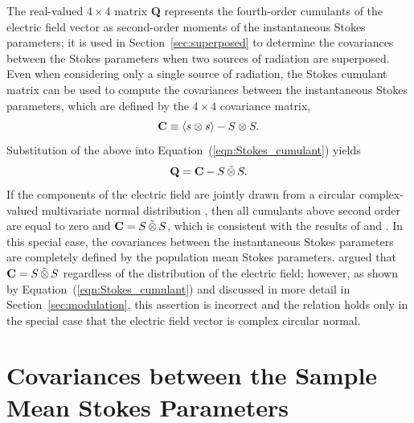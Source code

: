 \documentclass[twocolumn]{aastex6}
\newcommand{\Eqn}[1]{Equation~(\ref{eqn:#1})}
\newcommand{\Sec}[1]{Section~\ref{sec:#1}}
\newcommand{\outerBilinear}[2]{\ensuremath{{#1}\otimes{#2}}}
\newcommand{\stimes}{\ensuremath{\tilde{\otimes}}}
\newcommand{\spinorBilinear}[2]{\ensuremath{{#1}\,\stimes\,{#2}}}
\begin{document}
The real-valued $4\times4$ matrix {\bf Q} represents the fourth-order
cumulants of the electric field vector as second-order moments of the
instantaneous Stokes parameters; it is used in \Sec{superposed} to
determine the covariances between the Stokes parameters when two
sources of radiation are superposed.
%
Even when considering only a single source of radiation, the Stokes
cumulant matrix can be used to compute the covariances between the
instantaneous Stokes parameters, which are defined by the $4\times4$
covariance matrix,
%
\begin{equation}
  {\bf C} \equiv \langle\outerBilinear{s}{s}\rangle - \outerBilinear{S}{S}.
  \label{eqn:covariance-instantaneous}
\end{equation}
%
Substitution of the above into \Eqn{Stokes_cumulant} yields
\begin{equation}
  {\bf Q} = {\bf C} - \spinorBilinear{S}{S}.
\end{equation}
%
If the components of the electric field are jointly drawn from a
circular complex-valued multivariate normal distribution
\citep{goo63}, then all cumulants above second order are equal to
zero and ${\bf C}=\spinorBilinear{S}{S}$, which is
consistent with the results of \cite{bb92} and \cite{van09}.
%
In this special case, the covariances between the instantaneous Stokes
parameters are completely defined by the population mean Stokes
parameters.
%
\citet{van09} argued that ${\bf C}=\spinorBilinear{S}{S}$ regardless of the
distribution of the electric field; however, as shown by
\Eqn{Stokes_cumulant} and discussed in more detail in
\Sec{modulation}, this assertion is incorrect and the relation holds
only in the special case that the electric field vector is complex
circular normal.




\section{Covariances between the Sample Mean Stokes Parameters}
\label{sec:modes}
\end{document}
